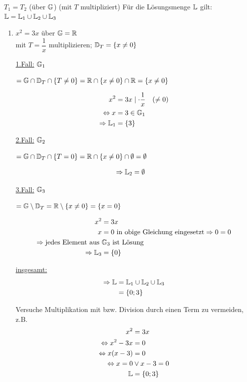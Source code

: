 \begin{itemize}
\begin{enumerate}
		$T_1=T_2$ (über $\mathbb{G}$) (mit $T$ multipliziert)
		\clearpage
		Für die Lösungsmenge $\mathbb{L}$ gilt:\\
		$\mathbb{L} = \mathbb{L}_1 \cup \mathbb{L}_2 \cup \mathbb{L}_3$
		
		\Bsps
		\begin{enumerate}
			\item $x^2 = 3x$ über $\mathbb{G}=\mathbb{R}$\\
			mit $T=\dfrac{1}{x}$ multiplizieren; $\mathbb{D}_T = \{x\ne0\}$
			
			\ul{1.Fall:} $\mathbb{G}_1$\parbox[t]{5cm}{$=\mathbb{G}\cap \mathbb{D}_T\cap\{T\ne0\}\\=\mathbb{R}\cap \{x\ne0\}\cap\mathbb{R} \\= \{x\ne0\}$}
			\begin{align*}
			x^2 &= 3x \mid \cdot \dfrac{1}{x}\quad(\ne0)\\
			\Leftrightarrow x &= 3\in\mathbb{G}_1\\
			\Rightarrow\mathbb{L}_1 &=\{3\}
			\end{align*}
			
			\ul{2.Fall:} $\mathbb{G}_2$\parbox[t]{5cm}{$=\mathbb{G}\cap \mathbb{D}_T\cap\{T=0\}\\=\mathbb{R}\cap \{x\ne0\}\cap\emptyset \\= \emptyset$}
			\begin{align*}
			\Rightarrow\mathbb{L}_2 &=\emptyset
			\end{align*}
			
			\ul{3.Fall:} $\mathbb{G}_3$\parbox[t]{5cm}{$=\mathbb{G}\setminus \mathbb{D}_T\\=\mathbb{R}\setminus \{x\ne0\} \\= \{x=0\}$}
			\begin{align*}
			x^2 &= 3x\\
			x &= 0 \text{ in obige Gleichung eingesetzt}\Rightarrow 0=0\\
			\Rightarrow \text{jedes Element aus }&\mathbb{G}_3\text{ ist Lösung}\\
			\Rightarrow\mathbb{L}_3 &=\{0\}
			\end{align*}
			
			\ul{insgesamt:}
			\begin{align*}
			\Rightarrow\mathbb{L} &=\mathbb{L}_1\cup\mathbb{L}_2\cup\mathbb{L}_3\\
			&= \{0;3\}
			\end{align*}
						
			\Bem Versuche Multiplikation mit bzw. Division durch einen Term zu vermeiden, z.B.
			\begin{align*}
			x^2 &= 3x\\
			\Leftrightarrow x^2-3x &= 0\\
			\Leftrightarrow x(x-3) &= 0\\
			\Leftrightarrow x=0 &\lor x-3=0\\
			\mathbb{L} &=\{0;3\}
			\end{align*}
			

\end{enumerate}
\end{enumerate}
\end{itemize}
